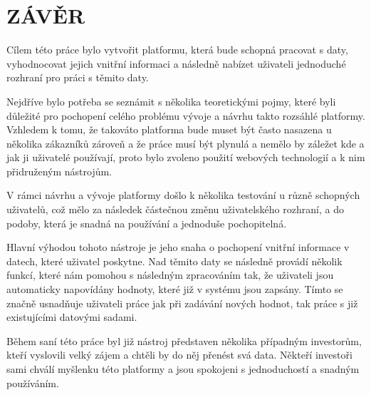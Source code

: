 \chapter*{ZÁVĚR}
\par Cílem této práce bylo vytvořit platformu, která bude schopná pracovat s daty, vyhodnocovat jejich vnitřní informaci a následně nabízet uživateli jednoduché rozhraní pro práci s těmito daty.

\par Nejdříve bylo potřeba se seznámit s několika teoretickými pojmy, které byli důležité pro pochopení celého problému vývoje a návrhu takto rozsáhlé platformy. Vzhledem k tomu, že takováto platforma bude muset být často nasazena u několika zákazníků zároveň a že práce musí být plynulá a nemělo by záležet kde a jak ji uživatelé používají, proto bylo zvoleno použití webových technologií a k nim přidruženým nástrojům.

\par V rámci návrhu a vývoje platformy došlo k několika testování u různě schopných uživatelů, což mělo za následek částečnou změnu uživatelského rozhraní, a do podoby, která je snadná na používání a jednoduše pochopitelná.

\par Hlavní výhodou tohoto nástroje je jeho snaha o pochopení vnitřní informace v datech, které uživatel poskytne. Nad těmito daty se následně provádí několik funkcí, které nám pomohou s následným zpracováním tak, že uživateli jsou automaticky napovídány hodnoty, které již v systému jsou zapsány. Tímto se značně usnadňuje uživateli práce jak při zadávání nových hodnot, tak práce s již existujícími datovými sadami.

\par Během saní této práce byl již nástroj představen několika případným investorům, kteří vyslovili velký zájem a chtěli by do něj přenést svá data. Někteří investoři sami chválí myšlenku této platformy a jsou spokojeni s jednoduchostí a snadným používáním.
